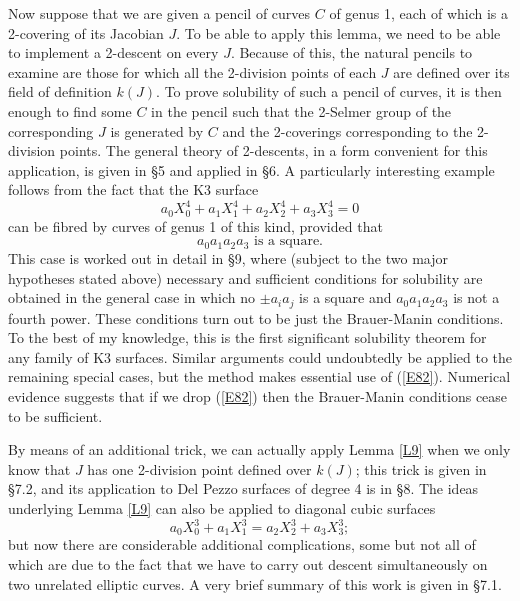 \documentclass[12pt]{article}
\def\beq{\begin{equation} \label}
\begin{document}
Now suppose that we are given a pencil of curves $C$ of genus 1, each
of which is a 2-covering of its Jacobian $J$. To be able to apply this lemma,
we need to be able to implement a 2-descent on every $J$. Because of this, the
natural pencils to examine are those for which all the 2-division points
of each $J$ are defined over its field of definition $k(J)$. To prove
solubility of such a pencil of curves, it is then enough to find some $C$
in the pencil such that the 2-Selmer group of the corresponding $J$ is
generated by $C$ and the 2-coverings corresponding to the 2-division points.
The general theory of 2-descents, in a form convenient for this application,
is given in \S5 and applied in \S6. A particularly interesting
example follows from the fact that the K3 surface
\[ a_0X_0^4+a_1X_1^4+a_2X_2^4+a_3X_3^4=0 \]
can be fibred by curves of genus 1 of this kind, provided that
\beq{E82} a_0a_1a_2a_3 \text{ is a square}. \end{equation}
This case is worked out in detail in \S9, where (subject to
the two major hypotheses stated above) necessary and
sufficient conditions for solubility are obtained in the
general case in which no $\pm a_ia_j$ is a square and
$a_0a_1a_2a_3$ is not a fourth power. These conditions turn
out to be just the Brauer-Manin conditions. To the best of my
knowledge, this is the first significant solubility theorem
for any family of K3 surfaces. Similar arguments could
undoubtedly be applied to the remaining special cases, but the
method makes essential use of (\ref{E82}). Numerical evidence
suggests that if we drop (\ref{E82}) then the Brauer-Manin
conditions cease to be sufficient.

By means of an additional trick, we can actually apply
Lemma \ref{L9} when we only know that $J$ has one 2-division
point defined over $k(J)$; this trick is given in \S7.2, and
its application to Del Pezzo surfaces of degree 4 is in \S8.
The ideas underlying Lemma \ref{L9} can also be applied to
diagonal cubic surfaces
\[ a_0X_0^3+a_1X_1^3=a_2X_2^3+a_3X_3^3; \]
but now there are considerable additional complications, some
but not all of which are due to the fact that we have to carry
out descent simultaneously on two unrelated elliptic curves.
A very brief summary of this work is given in \S7.1.

\newpage
\end{document}
